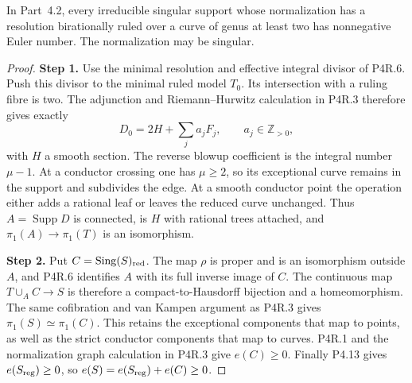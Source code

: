 \begin{proposition}[P4R.7]\label{night:P4R.7}\label{stmt:P4R.7}

In Part~4.2, every irreducible singular
support whose normalization has a
resolution birationally ruled over a
curve of genus at least two has
nonnegative Euler number. The
normalization may be singular.
\end{proposition}
\begin{proof}
\noindent\textbf{Step 1.} Use the minimal resolution and effective
integral divisor of P4R.6. Push this
divisor to the minimal ruled model
$T_0$. Its intersection with a ruling
fibre is two. The adjunction and
Riemann--Hurwitz calculation in P4R.3
therefore gives exactly
\[
 D_0=2H+\sum_j a_jF_j,
 \qquad a_j\in\mathbb Z_{>0},
\]
with $H$ a smooth section. The reverse
blowup coefficient is the integral
number $\mu-1$. At a conductor crossing
one has $\mu\ge2$, so its exceptional
curve remains in the support and
subdivides the edge. At a smooth
conductor point the operation either
adds a rational leaf or leaves the
reduced curve unchanged. Thus
$A=\operatorname{Supp}D$ is connected,
is $H$ with rational trees attached,
and $\pi_1(A)\to\pi_1(T)$ is an
isomorphism.

\noindent\textbf{Step 2.} Put $C=\operatorname{Sing}(S)_{\rm red}$.
The map $\rho$ is proper and is an
isomorphism outside $A$, and P4R.6
identifies $A$ with its full inverse
image of $C$. The continuous map
$T\cup_A C\to S$ is therefore a
compact-to-Hausdorff bijection and a
homeomorphism. The same cofibration
and van Kampen argument as P4R.3 gives
$\pi_1(S)\simeq\pi_1(C)$. This retains
the exceptional components that map
to points, as well as the strict
conductor components that map to
curves. P4R.1 and the normalization
graph calculation in P4R.3 give
$e(C)\ge0$. Finally P4.13 gives
$e(S_{\rm reg})\ge0$, so
$e(S)=e(S_{\rm reg})+e(C)\ge0$.
\end{proof}


